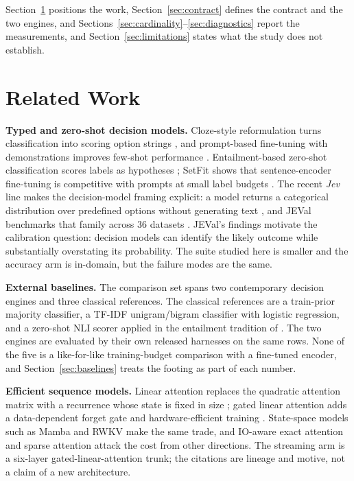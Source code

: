 Section~\ref{sec:related} positions the work, Section~\ref{sec:contract} defines the contract and
the two engines, and Sections~\ref{sec:cardinality}--\ref{sec:diagnostics} report the
measurements, and Section~\ref{sec:limitations} states what the study does not establish.

\section{Related Work}
\label{sec:related}

\textbf{Typed and zero-shot decision models.}
Cloze-style reformulation turns classification into scoring option strings
\citep{schick2021pet}, and prompt-based fine-tuning with demonstrations improves few-shot
performance \citep{gao2021lmbff}. Entailment-based zero-shot classification scores labels as
hypotheses \citep{yin2019benchmarking}; SetFit shows that sentence-encoder fine-tuning is
competitive with prompts at small label budgets \citep{tunstall2022setfit}. The recent \emph{Jev}
line makes the decision-model framing explicit: a model returns a categorical distribution over
predefined options without generating text \citep{li2026jev}, and JEVal benchmarks that family
across 36 datasets \citep{duan2026gdm}. JEVal's findings motivate the calibration question:
decision models can identify the likely outcome while substantially overstating its probability.
The suite studied here is smaller and the accuracy arm is in-domain, but the failure modes are
the same.

\textbf{External baselines.}
The comparison set spans two contemporary decision engines and three classical references. The
classical references are a train-prior majority classifier, a TF-IDF unigram/bigram classifier
with logistic regression, and a zero-shot NLI scorer applied in the entailment tradition of
\citet{yin2019benchmarking}. The two engines are evaluated by their own released harnesses on the
same rows. None of the five is a like-for-like training-budget comparison with a fine-tuned
encoder, and Section~\ref{sec:baselines} treats the footing as part of each number.

\textbf{Efficient sequence models.}
Linear attention replaces the quadratic attention matrix with a recurrence whose state is fixed
in size \citep{katharopoulos2020transformers}; gated linear attention adds a data-dependent forget
gate and hardware-efficient training \citep{yang2024gla}. State-space models such as Mamba
\citep{gu2024mamba} and RWKV \citep{peng2023rwkv} make the same trade, and IO-aware exact attention
\citep{dao2022flashattention} and sparse attention \citep{beltagy2020longformer} attack the cost
from other directions. The streaming arm is a six-layer gated-linear-attention trunk; the
citations are lineage and motive, not a claim of a new architecture.

